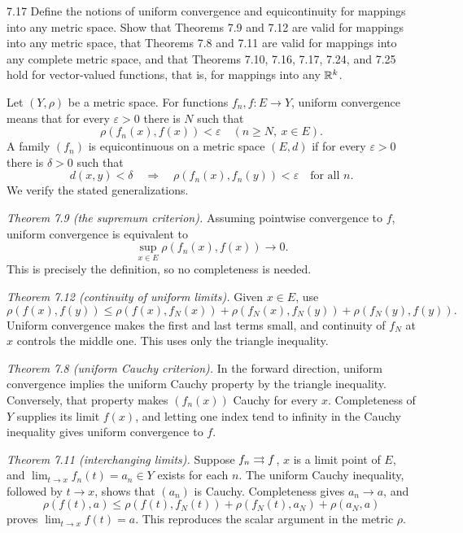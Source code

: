 \documentclass[11pt, oneside]{article}
\begin{document}
\begin{exercise}{7.17}
Define the notions of uniform convergence and equicontinuity for mappings into any metric space. Show that Theorems 7.9 and 7.12 are valid for mappings into any metric space, that Theorems 7.8 and 7.11 are valid for mappings into any complete metric space, and that Theorems 7.10, 7.16, 7.17, 7.24, and 7.25 hold for vector-valued functions, that is, for mappings into any $\mathbb{R}^k$.
\end{exercise}
\begin{solution}
Let $(Y, \rho)$ be a metric space. For functions $f_n, f\colon E\to Y$, uniform convergence means that for every $\varepsilon>0$ there is $N$ such that
\[
 \rho(f_n(x), f(x))<\varepsilon\quad(n\ge N, \ x\in E).
\]
A family $(f_n)$ is equicontinuous on a metric space $(E, d)$ if for every $\varepsilon>0$ there is $\delta>0$ such that
\[
 d(x, y)<\delta\quad\Longrightarrow\quad
 \rho(f_n(x), f_n(y))<\varepsilon\quad\text{for all }n.
\]
We verify the stated generalizations.

\textit{Theorem 7.9 (the supremum criterion).} Assuming pointwise convergence to $f$, uniform convergence is equivalent to
\[
 \sup_{x\in E}\rho(f_n(x), f(x))\longrightarrow0.
\]
This is precisely the definition, so no completeness is needed.

\textit{Theorem 7.12 (continuity of uniform limits).} Given $x\in E$, use
\[
 \rho(f(x), f(y))\le\rho(f(x), f_N(x))
 +\rho(f_N(x), f_N(y))+\rho(f_N(y), f(y)).
\]
Uniform convergence makes the first and last terms small, and continuity of $f_N$ at $x$ controls the middle one. This uses only the triangle inequality.

\textit{Theorem 7.8 (uniform Cauchy criterion).} In the forward direction, uniform convergence implies the uniform Cauchy property by the triangle inequality. Conversely, that property makes $(f_n(x))$ Cauchy for every $x$. Completeness of $Y$ supplies its limit $f(x)$, and letting one index tend to infinity in the Cauchy inequality gives uniform convergence to $f$.

\textit{Theorem 7.11 (interchanging limits).} Suppose $f_n\rightrightarrows f$, $x$ is a limit point of $E$, and $\lim_{t\to x}f_n(t)=a_n\in Y$ exists for each $n$. The uniform Cauchy inequality, followed by $t\to x$, shows that $(a_n)$ is Cauchy. Completeness gives $a_n\to a$, and
\[
 \rho(f(t), a)\le\rho(f(t), f_N(t))
 +\rho(f_N(t), a_N)+\rho(a_N, a)
\]
proves $\lim_{t\to x}f(t)=a$. This reproduces the scalar argument in the metric $\rho$.


\end{solution}
\end{document}
